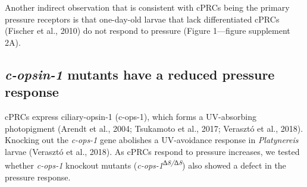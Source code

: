 \documentclass[
  11pt,
]{article}
\begin{document}
Another indirect observation that is consistent with cPRCs being the
primary pressure receptors is that one-day-old larvae that lack
differentiated cPRCs (Fischer et al., 2010) do not respond to pressure
(Figure 1---figure supplement 2A).

\subsection{\texorpdfstring{\emph{c-opsin-1} mutants have a reduced
pressure
response}{c-opsin-1 mutants have a reduced pressure response}}\label{c-opsin-1-mutants-have-a-reduced-pressure-response}

cPRCs express ciliary-opsin-1 (c-ops-1), which forms a UV-absorbing
photopigment (Arendt et al., 2004; Tsukamoto et al., 2017; Verasztó et
al., 2018). Knocking out the \emph{c-ops-1} gene abolishes a
UV-avoidance response in \emph{Platynereis} larvae (Verasztó et al.,
2018). As cPRCs respond to pressure increases, we tested whether
\emph{c-ops-1} knockout mutants (\emph{c-ops-1\textsuperscript{∆8/∆8}})
also showed a defect in the pressure response.
\end{document}
